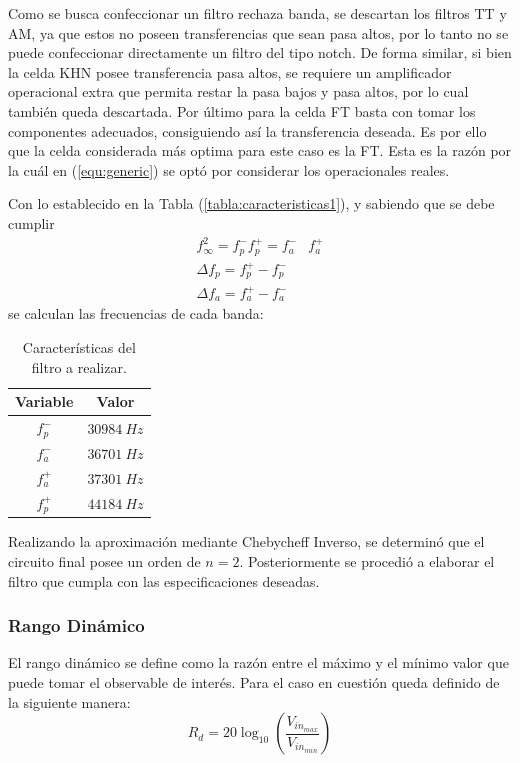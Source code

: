Como se busca confeccionar un filtro rechaza banda, se descartan los filtros TT y AM, ya que estos no poseen transferencias que sean pasa altos, por lo tanto no se puede confeccionar directamente un filtro del tipo notch. De forma similar, si bien la celda KHN posee transferencia pasa altos, se requiere un amplificador operacional extra que permita restar la pasa bajos y pasa altos, por lo cual también queda descartada. Por último para la celda FT basta con tomar los componentes adecuados, consiguiendo así la transferencia deseada. Es por ello que la celda considerada más optima para este caso es la FT. Esta es la razón por la cuál en (\ref{equ:generic}) se optó por considerar los operacionales reales.

Con lo establecido en la Tabla (\ref{tabla:caracteristicas1}), y sabiendo que se debe cumplir
\begin{equation}
\begin{split}
	f_{\infty}^{2} = f_{p}^{-} f_{p}^{+} = f_{a}^{-} & f_{a}^{+} \\
	\Delta f_p = f_{p}^{+} - f_{p}^{-} \\
	\Delta f_a = f_{a}^{+} - f_{a}^{-} 
\end{split}
\end{equation}
se calculan las frecuencias de cada banda:
\begin{table}[H]
\centering
\begin{tabular}{cc}
\hline
\textbf{Variable} & \textbf{Valor} \\
\hline
$f_{p}^{-}$ & $30984 \ Hz$ \\
$f_{a}^{-}$ & $36701 \ Hz$ \\
$f_{a}^{+}$ & $37301 \ Hz$ \\
$f_{p}^{+}$ & $44184\ Hz$ \\
\hline
\end{tabular}
\caption{Características del filtro a realizar.}
\label{tabla:caracteristicas2}
\end{table}

Realizando la aproximación mediante Chebycheff Inverso, se determinó que el circuito final posee un orden de $n = 2$. Posteriormente se procedió a elaborar el filtro que cumpla con las especificaciones deseadas.

\subsubsection{Rango Dinámico}
El rango dinámico se define como la razón entre el máximo y el mínimo valor que puede tomar el observable de interés. Para el caso en cuestión queda definido de la siguiente manera:
\begin{equation}
	R_d = 20 \log_{10} \left( \frac{V_{in_{max}}}{V_{in_{min}}} \right)
\end{equation}

